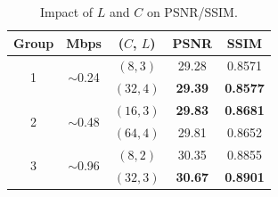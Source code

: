 \documentclass[letterpaper]{article} %
\begin{document}
	\begin{table}[t]
		\caption{Impact of $L$ and $C$ on PSNR/SSIM.}
		\centering   
		\begin{tabular}{ccccc}
			\toprule
			Group & Mbps & ($C$, $L$) & PSNR & SSIM \\
			\hline
			\multirow{2}{*}{1} & \multirow{2}{*}{$\sim$0.24} &$(8, 3)$ & 29.28 & 0.8571 \\
			
			& & $(32, 4)$ & \textbf{29.39} & \textbf{0.8577} \\
			\hline
			
			\multirow{2}{*}{2} & \multirow{2}{*}{$\sim$0.48} & $(16, 3)$ & \textbf{29.83} & \textbf{0.8681} \\
			
			& & $(64, 4)$ & 29.81 & 0.8652 \\
			\hline
			
			\multirow{2}{*}{3} & \multirow{2}{*}{$\sim$0.96} & $(8, 2)$ & 30.35 & 0.8855 \\
			
			& & $(32, 3)$ & \textbf{30.67} & \textbf{0.8901} \\
			\bottomrule
		\end{tabular}
		\label{tab:bitrate}
	\end{table}
\end{document}
